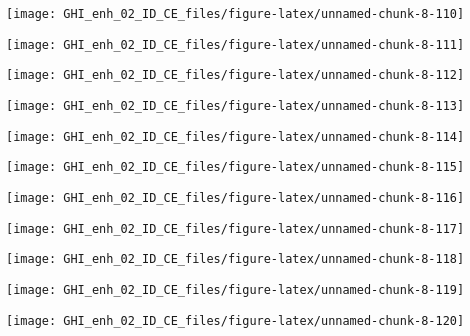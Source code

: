 \documentclass[
  10pt,
  a4paper,oneside]{article}
\begin{document}
\begin{center}\texttt{[image: GHI\_enh\_02\_ID\_CE\_files/figure-latex/unnamed-chunk-8-110]} \end{center}

\begin{center}\texttt{[image: GHI\_enh\_02\_ID\_CE\_files/figure-latex/unnamed-chunk-8-111]} \end{center}

\begin{center}\texttt{[image: GHI\_enh\_02\_ID\_CE\_files/figure-latex/unnamed-chunk-8-112]} \end{center}

\begin{center}\texttt{[image: GHI\_enh\_02\_ID\_CE\_files/figure-latex/unnamed-chunk-8-113]} \end{center}

\begin{center}\texttt{[image: GHI\_enh\_02\_ID\_CE\_files/figure-latex/unnamed-chunk-8-114]} \end{center}

\begin{center}\texttt{[image: GHI\_enh\_02\_ID\_CE\_files/figure-latex/unnamed-chunk-8-115]} \end{center}

\begin{center}\texttt{[image: GHI\_enh\_02\_ID\_CE\_files/figure-latex/unnamed-chunk-8-116]} \end{center}

\begin{center}\texttt{[image: GHI\_enh\_02\_ID\_CE\_files/figure-latex/unnamed-chunk-8-117]} \end{center}

\begin{center}\texttt{[image: GHI\_enh\_02\_ID\_CE\_files/figure-latex/unnamed-chunk-8-118]} \end{center}

\begin{center}\texttt{[image: GHI\_enh\_02\_ID\_CE\_files/figure-latex/unnamed-chunk-8-119]} \end{center}

\begin{center}\texttt{[image: GHI\_enh\_02\_ID\_CE\_files/figure-latex/unnamed-chunk-8-120]} \end{center}
\end{document}
